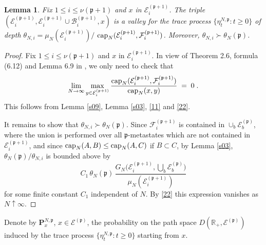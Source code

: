 \documentclass[reqno]{amsart}
\newtheorem{lemma}[theorem]{Lemma}
\begin{document}
\begin{lemma}
\label{s15}
Fix $1\le i\le \nu ({{\mathfrak p}}+1)$ and $x$ in ${{\mathcal E}}^{({{\mathfrak p}} +1)}_i$.  The
triple $({{\mathcal E}}^{({{\mathfrak p}} +1)}_i, {{\mathcal E}}^{({{\mathfrak p}} +1)}_i \cup {{\mathcal B}}^{({{\mathfrak p}}
  +1)}_i ,x)$ is a valley for the trace process $\{\eta^{N,{{\mathfrak p}}}_t :
t\ge 0\}$ of depth $\theta_{N,i} = \mu_N({{\mathcal E}}^{({{\mathfrak p}} +1)}_i)/$
${{\rm cap}}_N ({{\mathcal E}}^{({{\mathfrak p}} +1)}_i , {{\mathcal F}}^{({{\mathfrak p}} +1)}_i)$. Moreover,
$\theta_{N,i} \succ \theta_N({{\mathfrak p}})$.
\end{lemma}

\begin{proof}
Fix $1\le i\le \nu ({{\mathfrak p}}+1)$ and $x$ in ${{\mathcal E}}^{({{\mathfrak p}} +1)}_i$.  In
view of Theorem 2.6, formula (6.12) and Lemma 6.9 in \cite{bl2}, we
only need to check that
\begin{equation*}
\lim_{N\to\infty} \max_{y\in {{\mathcal E}}^{({{\mathfrak p}} +1)}_i} 
\frac{{{\rm cap}}_N({{\mathcal E}}^{({{\mathfrak p}} +1)}_i , {{\mathcal F}}^{({{\mathfrak p}} +1)}_i)}
{{{\rm cap}}_N(x,y)}\;=\; 0\;.
\end{equation*}
This follows from Lemma \ref{s09}, Lemma \ref{s03}, \eqref{11} and
\eqref{22}.

It remains to show that $\theta_{N,i} \succ \theta_N({{\mathfrak p}})$.  Since
${{\mathcal F}}^{({{\mathfrak p}} +1)}_i$ is contained in $\cup_b {{\mathcal E}}^{({{\mathfrak p}})}_b$,
where the union is performed over all ${{\mathfrak p}}$-metastates which are not
contained in ${{\mathcal E}}^{({{\mathfrak p}} +1)}_i$, and since ${{\rm cap}}_N(A,B) \le
{{\rm cap}}_N(A,C)$ if $B\subset C$, by Lemma \ref{s03}, $\theta_N({{\mathfrak p}})/\theta_{N,i}$ is bounded above by
\begin{equation*}
C_1\, \theta_N({{\mathfrak p}}) \, 
\frac{ G_N \Big({{\mathcal E}}^{({{\mathfrak p}} +1)}_i ,\bigcup_b {{\mathcal E}}^{({{\mathfrak p}})}_b
  \Big)}{\mu_N({{\mathcal E}}^{({{\mathfrak p}} +1)}_i)}  
\end{equation*}
for some finite constant $C_1$ independent of $N$. By \eqref{22} this
expression vanishes as $N\uparrow\infty$.
\end{proof}

Denote by ${{\mathbf P}}_x^{N,{{\mathfrak p}}}$, $x\in {{\mathcal E}}^{({{\mathfrak p}})}$, the probability
on the path space $D({{\mathbb R}}_+, {{\mathcal E}}^{({{\mathfrak p}})})$ induced by the trace
process $\{\eta^{N,{{\mathfrak p}}}_t : t\ge 0\}$ starting from $x$.
\end{document}

